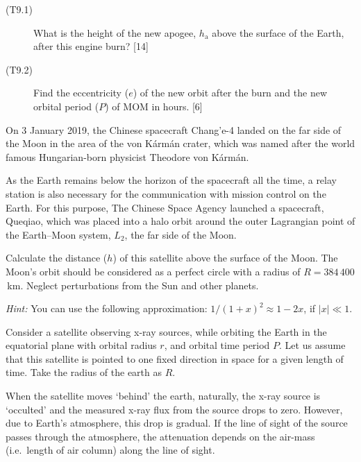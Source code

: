 \begin{description}
\item[(T9.1)] What is the height of the new apogee, $h_{\mathrm{a}}$ above the
  surface of the Earth, after this engine burn? \hfill[14]
\item[(T9.2)] Find the eccentricity ($e$) of the new orbit after the burn and
  the new orbital period ($P$) of MOM in hours. \hfill[6]
\end{description}

On 3 January 2019, the Chinese spacecraft Chang'e-4 landed on the far side of
the Moon in the area of the von K\'arm\'an crater, which was named after the
world famous Hungarian-born physicist Theodore von K\'arm\'an.

As the Earth remains below the horizon of the spacecraft all the time, a relay
station is also necessary for the communication with mission control on the
Earth. For this purpose, The Chinese Space Agency launched a spacecraft,
Queqiao, which was placed into a halo orbit around the outer Lagrangian point
of the Earth--Moon system, $L_2$, the far side of the Moon.

Calculate the distance ($h$) of this satellite above the surface of the Moon.
The Moon's orbit should be considered as a perfect circle with a radius of
$R = 384\,400$\,km. Neglect perturbations from the Sun and other planets.

\emph{Hint:} You can use the following approximation:
$1/(1+x)^2 \approx 1 - 2x$, if $|x| \ll 1$.

Consider a satellite observing x-ray sources, while orbiting the Earth in the
equatorial plane with orbital radius $r$, and orbital time period $P$. Let us
assume that this satellite is pointed to one fixed direction in space for a
given length of time. Take the radius of the earth as $R$.

When the satellite moves `behind' the earth, naturally, the x-ray source is
`occulted' and the measured x-ray flux from the source drops to zero. However,
due to Earth's atmosphere, this drop is gradual. If the line of sight of the
source passes through the atmosphere, the attenuation depends on the air-mass
(i.e.\ length of air column) along the line of sight.

